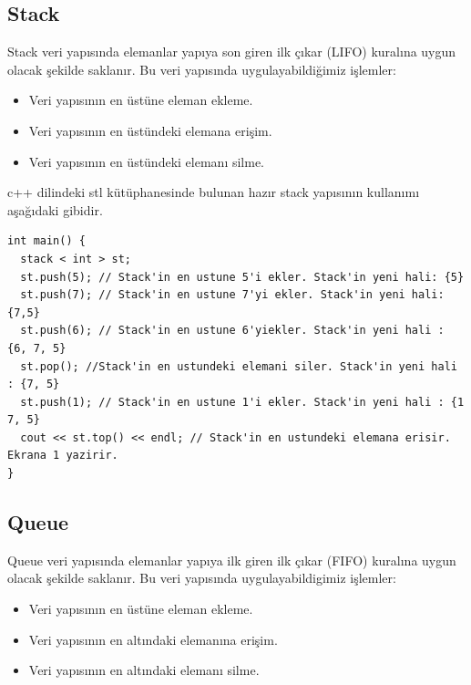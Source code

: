 \documentclass[12pt]{article}
\begin{document}
	\subsection{Stack}
    
    Stack veri yap{\i}s{\i}nda elemanlar yap{\i}ya son giren ilk \c{c}{\i}kar (LIFO) kural{\i}na uygun olacak \c{s}ekilde saklan{\i}r. Bu veri yap{\i}s{\i}nda uygulayabildi\u{g}imiz i\c{s}lemler:
    
    \begin{itemize}
        \item Veri yap{\i}s{\i}n{\i}n en \"{u}st\"{u}ne eleman ekleme.
        \item Veri yap{\i}s{\i}n{\i}n en \"{u}st\"{u}ndeki elemana eri\c{s}im.
        \item Veri yap{\i}s{\i}n{\i}n en \"{u}st\"{u}ndeki eleman{\i} silme.
    \end{itemize}
    
    c++ dilindeki stl k\"{u}t\"{u}phanesinde bulunan haz{\i}r stack yap{\i}s{\i}n{\i}n kullan{\i}m{\i} a\c{s}a\u{g}{\i}daki gibidir.
    
    \begin{verbatim}
int main() {
  stack < int > st;
  st.push(5); // Stack'in en ustune 5'i ekler. Stack'in yeni hali: {5}
  st.push(7); // Stack'in en ustune 7'yi ekler. Stack'in yeni hali: {7,5}
  st.push(6); // Stack'in en ustune 6'yiekler. Stack'in yeni hali : {6, 7, 5}
  st.pop(); //Stack'in en ustundeki elemani siler. Stack'in yeni hali : {7, 5}
  st.push(1); // Stack'in en ustune 1'i ekler. Stack'in yeni hali : {1 7, 5}
  cout << st.top() << endl; // Stack'in en ustundeki elemana erisir. Ekrana 1 yazirir.  
}
    \end{verbatim}
	
	\subsection{Queue}

    Queue veri yap{\i}s{\i}nda elemanlar yap{\i}ya ilk giren ilk \c{c}{\i}kar (FIFO) kural{\i}na uygun olacak \c{s}ekilde saklan{\i}r. Bu veri yap{\i}s{\i}nda uygulayabildigimiz i\c{s}lemler:
    
    \begin{itemize}
        \item Veri yap{\i}s{\i}n{\i}n en \"{u}st\"{u}ne eleman ekleme.
        \item Veri yap{\i}s{\i}n{\i}n en alt{\i}ndaki eleman{\i}na eri\c{s}im.
        \item Veri yap{\i}s{\i}n{\i}n en alt{\i}ndaki eleman{\i} silme.
    \end{itemize}
    
\end{document}
